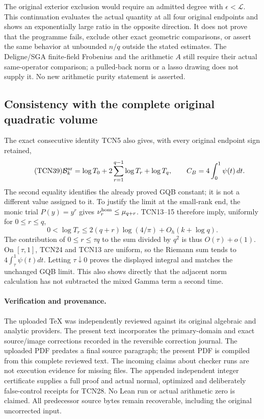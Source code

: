 \documentclass[11pt,a4paper]{article}
\begin{document}
The original exterior exclusion would require an admitted degree with
$\epsilon<\mathcal L$. This continuation evaluates the actual quantity
at all four original endpoints and shows an exponentially large ratio
in the opposite direction. It does not prove that the programme fails,
exclude other exact geometric comparisons, or assert the same behavior
at unbounded $n/q$ outside the stated estimates. The Deligne/SGA
finite-field Frobenius and the arithmetic $A$ still require their
actual same-operator comparison; a pulled-back norm or a lasso drawing
does not supply it. No new arithmetic purity statement is asserted.


\subsection{Consistency with the complete original quadratic volume}
The exact consecutive identity TCN5 also gives, with every original
endpoint sign retained,
\begin{equation}\tag{TCN39}
 \mathcal B_k^{\mathrm{ar}}=\log T_0+
       2\sum_{r=1}^{q-1}\log T_r+\log T_q,
 \qquad C_B=4\int_0^1\psi(t)\,dt.
\end{equation}
The second equality identifies the already proved GQB constant; it
is not a different value assigned to it. To justify the limit at the
small-rank end, the monic trial $P(y)=y^r$ gives
$\nu_r^{\rm hom}\le\mu_{q+r}$. TCN13--15 therefore imply, uniformly
for $0\le r\le q$,
\[
 0<\log T_r\le2(q+r)\log(4/\pi)+O_h(k+\log q).
\]
The contribution of $0\le r\le\tau q$ to the sum divided by $q^2$
is thus $O(\tau)+o(1)$. On $[\tau,1]$, TCN24 and TCN13 are uniform,
so the Riemann sum tends to $4\int_\tau^1\psi(t)dt$.
Letting $\tau\downarrow0$ proves the displayed integral and matches
the unchanged GQB limit. This also shows directly that the adjacent
norm calculation has not subtracted the mixed Gamma term a second time.

\paragraph{Verification and provenance.}
The uploaded TeX was independently reviewed against its original
algebraic and analytic providers. The present text incorporates the
primary-domain and exact source/image corrections recorded in the
reversible correction journal. The uploaded PDF predates a final
source paragraph; the present PDF is compiled from this complete
reviewed text. The incoming claims about checker runs are not
execution evidence for missing files. The appended independent
integer certificate supplies a full proof and actual normal, optimized
and deliberately false-control receipts for TCN28. No Lean run or
actual arithmetic zero is claimed. All predecessor source bytes
remain recoverable, including the original uncorrected input.
\end{document}
